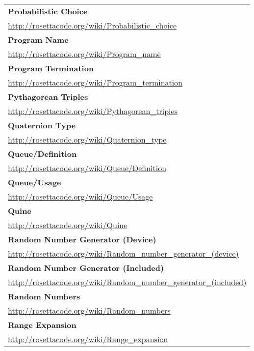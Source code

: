 \begin{longtable}{l}
\textbf{
Probabilistic Choice } \\ \href{http://rosettacode.org/wiki/Probabilistic\_choice}{http://rosettacode.org/wiki/Probabilistic\_choice} \\
\textbf{Program Name } \\ \href{http://rosettacode.org/wiki/Program\_name}{http://rosettacode.org/wiki/Program\_name} \\
\textbf{Program Termination } \\ \href{http://rosettacode.org/wiki/Program\_termination}{http://rosettacode.org/wiki/Program\_termination} \\
\textbf{
Pythagorean Triples } \\ \href{http://rosettacode.org/wiki/Pythagorean\_triples}{http://rosettacode.org/wiki/Pythagorean\_triples} \\
\textbf{Quaternion Type } \\ \href{http://rosettacode.org/wiki/Quaternion\_type}{http://rosettacode.org/wiki/Quaternion\_type} \\
\textbf{Queue/Definition } \\ \href{http://rosettacode.org/wiki/Queue/Definition}{http://rosettacode.org/wiki/Queue/Definition} \\
\textbf{
Queue/Usage } \\ \href{http://rosettacode.org/wiki/Queue/Usage}{http://rosettacode.org/wiki/Queue/Usage} \\
\textbf{Quine } \\ \href{http://rosettacode.org/wiki/Quine}{http://rosettacode.org/wiki/Quine} \\
\textbf{Random Number Generator (Device) } \\ \href{http://rosettacode.org/wiki/Random\_number\_generator\_(device)}{http://rosettacode.org/wiki/Random\_number\_generator\_(device)} \\
\textbf{
Random Number Generator (Included) } \\ \href{http://rosettacode.org/wiki/Random\_number\_generator\_(included)}{http://rosettacode.org/wiki/Random\_number\_generator\_(included)} \\
\textbf{Random Numbers } \\ \href{http://rosettacode.org/wiki/Random\_numbers}{http://rosettacode.org/wiki/Random\_numbers} \\
\textbf{
Range Expansion } \\ \href{http://rosettacode.org/wiki/Range\_expansion}{http://rosettacode.org/wiki/Range\_expansion} \\

\end{longtable}
